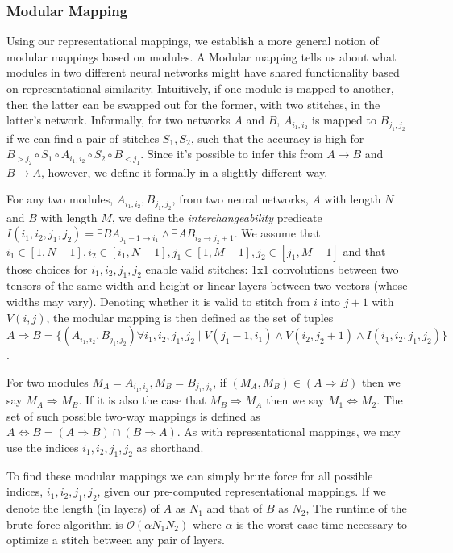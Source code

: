 \documentclass{article} %
\begin{document}
\subsubsection*{Modular Mapping}
Using our representational mappings, we establish a more general notion of modular mappings based on modules. A Modular mapping
tells us about what modules in two different neural networks might have shared functionality based on representational similarity.
Intuitively, if one module is mapped to another, then the latter can be swapped out for the former, with two stitches, in the latter's network.
Informally, for two networks \(A\) and \(B\), \(A_{i_1, i_2}\) is mapped to \(B_{j_1, j_2}\) if we can find a pair of stitches \(S_1, S_2\), such that the accuracy is high for
\(B_{>j_2} \circ S_1 \circ A_{i_1,i_2} \circ S_2 \circ B_{<j_1}\). Since it's possible to infer this from \(A \rightarrow B\) and \(B \rightarrow A\),
however, we define it formally in a slightly different way.

For any two modules, \(A_{i_1, i_2}, B_{j_1, j_2}\), from two neural networks, \(A\) with length \(N\) and \(B\) with length \(M\), we define the \emph{interchangeability}
predicate \(I(i_1, i_2, j_1, j_2) = \exists BA_{j_1 - 1 \rightarrow i_1} \land \exists AB_{i_2 \rightarrow j_2 + 1}\).
We assume that \(i_1 \in [1, N-1], i_2 \in [i_1, N-1], j_1 \in [1, M-1], j_2 \in [j_1, M-1]\) and that those choices for
\(i_1, i_2, j_1, j_2\) enable valid stitches: 1x1 convolutions between two tensors of the same width and height or
linear layers between two vectors (whose widths may vary). Denoting whether it is valid to stitch from \(i\) into \(j+1\) with \(V(i, j)\),
the modular mapping is then defined as the set of tuples
\(A \Rightarrow B = \{(A_{i_1, i_2}, B_{j_1, j_2}) \forall i_1, i_2, j_1, j_2 \mid V(j_1-1, i_1) \land V(i_2, j_2+1) \land I(i_1, i_2, j_1, j_2)\}\).


For two modules \(M_A = A_{i_1, i_2}, M_B = B_{j_1, j_2}\), if \((M_A, M_B) \in (A \Rightarrow B)\) then we say \(M_A \Rightarrow M_B\). If it is
also the case that \(M_B \Rightarrow M_A\) then we say \(M_1 \Leftrightarrow M_2\). The set of such possible two-way mappings is defined as
\(A \Leftrightarrow B = (A \Rightarrow B) \cap (B \Rightarrow A)\). As with representational mappings, we may use the indices
\(i_1, i_2, j_1, j_2\) as shorthand.

To find these modular mappings we can simply brute force for all possible indices, \(i_1, i_2, j_1, j_2\),
given our pre-computed representational mappings. If we denote the length (in layers) of \(A\) as \(N_1\) and
that of \(B\) as \(N_2\), The runtime of the brute force algorithm is \(\mathcal{O}(\alpha N_1 N_2)\) where \(\alpha\) is
the worst-case time necessary to optimize a stitch between any pair of layers.
\end{document}

